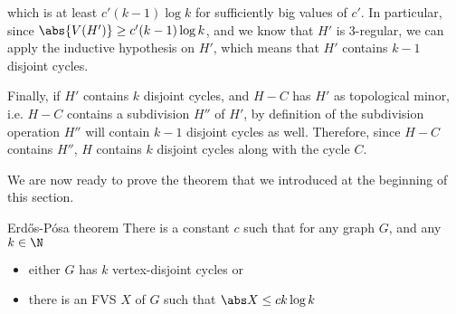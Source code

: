 \documentclass[a4paper, 12pt]{report}
\begin{document}
{        which is at least $c'(k - 1) \log k$ for sufficiently big values of $c'$. In particular, since $\abs{V(H')} \ge c' (k - 1) \log k$, and we know that $H'$ is 3-regular, we can apply the inductive hypothesis on $H'$, which means that $H'$ contains $k - 1$ disjoint cycles.

        Finally, if $H'$ contains $k$ disjoint cycles, and $H - C$ has $H'$ as topological minor, i.e. $H - C$ contains a subdivision $H''$ of $H'$, by definition of the subdivision operation $H''$ will contain $k -1$ disjoint cycles as well. Therefore, since $H - C$ contains $H''$, $H$ contains $k$ disjoint cycles along with the cycle $C$.
    }

    We are now ready to prove the theorem that we introduced at the beginning of this section.

    \begin{framedthm}{Erdős-Pósa theorem}
        There is a constant $c$ such that for any graph $G$, and any $k \in \N$

        \begin{itemize}
            \item either $G$ has $k$ vertex-disjoint cycles or
            \item there is an FVS $X$ of $G$ such that $\abs X \le c k\log k$
        \end{itemize}
    \end{framedthm}
\end{document}
